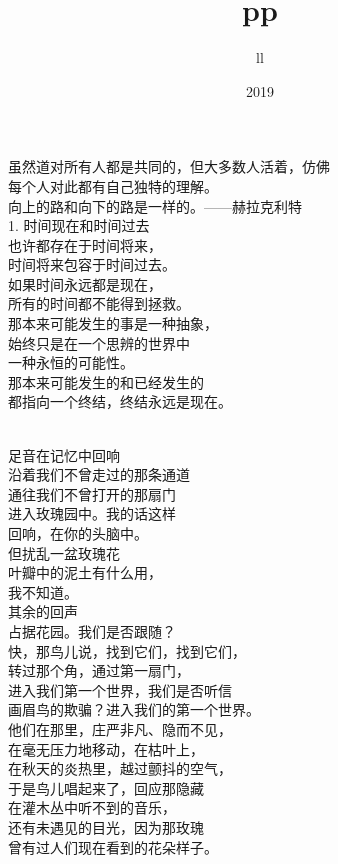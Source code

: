 \documentclass{article}
\title{pp}
\author{ll}
\date{2019}
\begin{document}

\maketitle

\setlength\parindent{0pt}


\Large

﻿虽然道对所有人都是共同的，但大多数人活着，仿佛\\
每个人对此都有自己独特的理解。\\
向上的路和向下的路是一样的。——赫拉克利特
\\
1. 时间现在和时间过去\\
也许都存在于时间将来，\\
时间将来包容于时间过去。\\
如果时间永远都是现在，\\
所有的时间都不能得到拯救。\\
那本来可能发生的事是一种抽象，\\
始终只是在一个思辨的世界中\\
一种永恒的可能性。\\
那本来可能发生的和已经发生的\\
都指向一个终结，终结永远是现在。

\newpage 


\\
足音在记忆中回响\\
沿着我们不曾走过的那条通道\\
通往我们不曾打开的那扇门\\
进入玫瑰园中。我的话这样\\
回响，在你的头脑中。\\
但扰乱一盆玫瑰花\\
叶瓣中的泥土有什么用，\\
我不知道。\\
其余的回声\\
占据花园。我们是否跟随？\\
快，那鸟儿说，找到它们，找到它们，\\
转过那个角，通过第一扇门，\\
进入我们第一个世界，我们是否听信\\
画眉鸟的欺骗？进入我们的第一个世界。\\
他们在那里，庄严非凡、隐而不见，\\
在毫无压力地移动，在枯叶上，\\
在秋天的炎热里，越过颤抖的空气，\\
于是鸟儿唱起来了，回应那隐藏\\
在灌木丛中听不到的音乐，\\
还有未遇见的目光，因为那玫瑰\\
曾有过人们现在看到的花朵样子。
\end{document}
